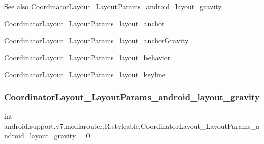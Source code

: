 \begin{DoxySeeAlso}{See also}
\hyperlink{classandroid_1_1support_1_1v7_1_1mediarouter_1_1R_1_1styleable_a6e2ae86a404cb3d13c873f2ad439780a}{Coordinator\+Layout\+\_\+\+Layout\+Params\+\_\+android\+\_\+layout\+\_\+gravity} 

\hyperlink{classandroid_1_1support_1_1v7_1_1mediarouter_1_1R_1_1styleable_a032a1c082915d23c481db8f517cb0efe}{Coordinator\+Layout\+\_\+\+Layout\+Params\+\_\+layout\+\_\+anchor} 

\hyperlink{classandroid_1_1support_1_1v7_1_1mediarouter_1_1R_1_1styleable_a22a95723a15dc3be9d3d0a5455654f10}{Coordinator\+Layout\+\_\+\+Layout\+Params\+\_\+layout\+\_\+anchor\+Gravity} 

\hyperlink{classandroid_1_1support_1_1v7_1_1mediarouter_1_1R_1_1styleable_ade4008b88df0372b323afc6e03e8ae46}{Coordinator\+Layout\+\_\+\+Layout\+Params\+\_\+layout\+\_\+behavior} 

\hyperlink{classandroid_1_1support_1_1v7_1_1mediarouter_1_1R_1_1styleable_a9ac79aa4f24497605b5aa2caad3e872c}{Coordinator\+Layout\+\_\+\+Layout\+Params\+\_\+layout\+\_\+keyline} 
\end{DoxySeeAlso}
\mbox{\label{classandroid_1_1support_1_1v7_1_1mediarouter_1_1R_1_1styleable_a6e2ae86a404cb3d13c873f2ad439780a}} 
\subsubsection{\texorpdfstring{Coordinator\+Layout\+\_\+\+Layout\+Params\+\_\+android\+\_\+layout\+\_\+gravity}{CoordinatorLayout\_LayoutParams\_android\_layout\_gravity}}
{\footnotesize\ttfamily int android.\+support.\+v7.\+mediarouter.\+R.\+styleable.\+Coordinator\+Layout\+\_\+\+Layout\+Params\+\_\+android\+\_\+layout\+\_\+gravity = 0\hspace{0.3cm}{\ttfamily [static]}}

